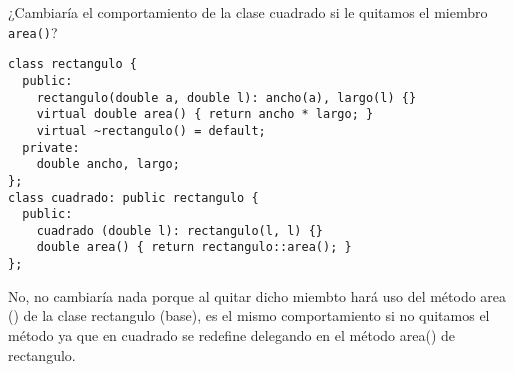  ¿Cambiaría el comportamiento de la clase cuadrado si le quitamos el miembro \texttt{area()}?

\begin{lstlisting}[frame = single]
class rectangulo {
  public:
    rectangulo(double a, double l): ancho(a), largo(l) {}
    virtual double area() { return ancho * largo; }
    virtual ~rectangulo() = default;
  private:
    double ancho, largo;
};
class cuadrado: public rectangulo {
  public:
    cuadrado (double l): rectangulo(l, l) {}
    double area() { return rectangulo::area(); }
};
\end{lstlisting}

No, no cambiaría nada porque al quitar dicho miembto hará uso del método area () de la clase rectangulo (base), es el mismo comportamiento si no quitamos el método ya que en cuadrado se redefine delegando en el método area() de rectangulo.


 